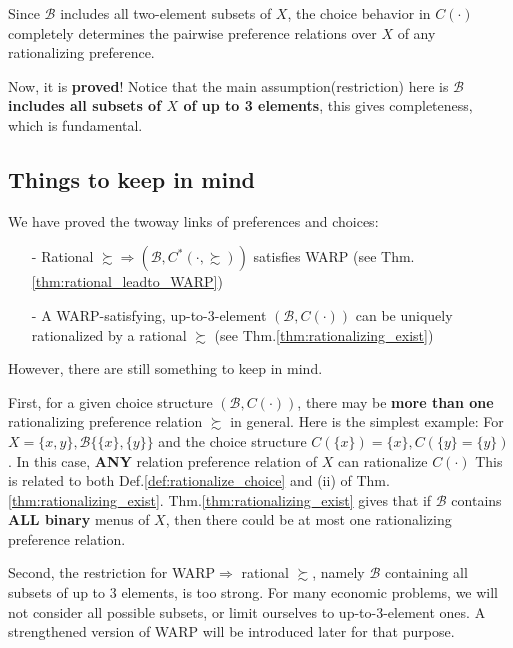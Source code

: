 \begin{enumerate}
    Since $\mathcal{B}$ includes all two-element subsets of $X$, the choice behavior in $C(\cdot)$ completely determines the pairwise preference relations over $X$ of any rationalizing preference.
\end{enumerate}

Now, it is \textbf{proved}! Notice that the main assumption(restriction) here is \textbf{$\mathcal{B}$ includes all subsets of $X$ of up to 3 elements}, this gives completeness, which is fundamental.

\subsection*{Things to keep in mind}
We have proved the twoway links of preferences and choices:
\begin{enumerate}
    \item[-] Rational $\succsim\Rightarrow (\mathcal{B},C^*(\cdot,\succsim))$ satisfies WARP (see Thm.\ref{thm:rational_leadto_WARP})
    \item[-] A WARP-satisfying, up-to-3-element $(\mathcal{B},C(\cdot))$ can be uniquely rationalized by a rational $\succsim$ (see Thm.\ref{thm:rationalizing_exist})
\end{enumerate}
However, there are still something to keep in mind.

First, for a given choice structure $(\mathcal{B},C(\cdot))$, there may be \textbf{more than one} rationalizing preference relation $\succsim$ in general. Here is the simplest example:
For $X=\{x,y\},\mathcal{B}\{\{x\},\{y\}\}$ and the choice structure $C(\{x\})=\{x\}, C(\{y\}=\{y\})$. In this case, \textbf{ANY} relation preference relation of $X$ can rationalize $C(\cdot)$
This is related to both Def.\ref{def:rationalize_choice} and (ii) of Thm.\ref{thm:rationalizing_exist}. Thm.\ref{thm:rationalizing_exist} gives that if $\mathcal{B}$ contains \textbf{ALL binary} menus of $X$,
then there could be at most one rationalizing preference relation.

Second, the restriction for WARP$\Rightarrow$ rational $\succsim$, namely $\mathcal{B}$ containing all subsets of up to 3 elements, is too strong. For many economic problems, we will not consider all possible subsets, or limit ourselves to up-to-3-element ones. A strengthened version of WARP will be introduced later for that purpose.

